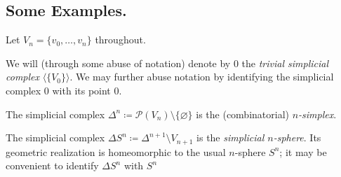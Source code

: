 

\subsection*{Some Examples.}

Let $V_n = \{v_0, \dots, v_n\}$ throughout.

\begin{example}
    We will (through some abuse of notation) denote by $0$ the \emph{trivial simplicial complex} $\langle \{V_0\} \rangle$.
    We may further abuse notation by identifying the simplicial complex $0$ with its point $0$.
\end{example}

\begin{example}
    The simplicial complex $\Delta^n \coloneqq \mathcal{P}(V_n) \setminus \{\varnothing\}$ is the (combinatorial)
    \emph{$n$-simplex}.

    The simplicial complex $\Delta S^n \coloneqq \Delta^{n+1} \setminus V_{n+1}$ is the \emph{simplicial $n$-sphere}. Its geometric
    realization is homeomorphic to the usual $n$-sphere $S^n$; it may be convenient to identify $\Delta S^n$ with $S^n$
\end{example}
    

